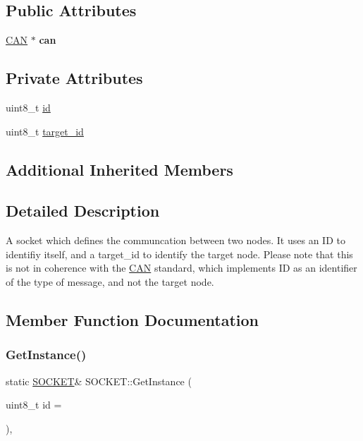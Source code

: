 \subsection*{Public Attributes}
\begin{DoxyCompactItemize}
\item 
\hypertarget{class_s_o_c_k_e_t_a40e1973f231f6e5c51f02bfb8e7c0722}{}\label{class_s_o_c_k_e_t_a40e1973f231f6e5c51f02bfb8e7c0722} 
\hyperlink{class_c_a_n}{C\+AN} $\ast$ {\bfseries can}
\end{DoxyCompactItemize}
\subsection*{Private Attributes}
\begin{DoxyCompactItemize}
\item 
uint8\+\_\+t \hyperlink{class_s_o_c_k_e_t_a0755fe74751c2d94d3d1679cad9e6544}{id}
\item 
uint8\+\_\+t \hyperlink{class_s_o_c_k_e_t_a566ef7ae1ca5366f622bbe805954a031}{target\+\_\+id}
\end{DoxyCompactItemize}
\subsection*{Additional Inherited Members}


\subsection{Detailed Description}
A socket which defines the communcation between two nodes. It uses an ID to identifiy itself, and a target\+\_\+id to identify the target node. Please note that this is not in coherence with the \hyperlink{class_c_a_n}{C\+AN} standard, which implements ID as an identifier of the type of message, and not the target node. 

\subsection{Member Function Documentation}
\hypertarget{class_s_o_c_k_e_t_affb9b8540e07a471a1e48c0e4f595831}{}\label{class_s_o_c_k_e_t_affb9b8540e07a471a1e48c0e4f595831} 
\subsubsection{\texorpdfstring{Get\+Instance()}{GetInstance()}}
{\footnotesize\ttfamily static \hyperlink{class_s_o_c_k_e_t}{S\+O\+C\+K\+ET}\& S\+O\+C\+K\+E\+T\+::\+Get\+Instance (\begin{DoxyParamCaption}\item[{uint8\+\_\+t}]{id = {} }\end{DoxyParamCaption})\hspace{0.3cm}{\ttfamily [inline]}, {\ttfamily [static]}}


